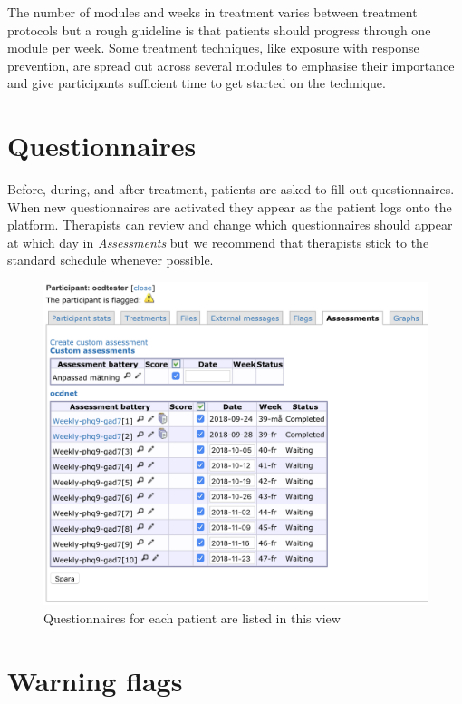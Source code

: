 \documentclass[]{book}
\theoremstyle{definition}
\theoremstyle{definition}
\theoremstyle{definition}
\theoremstyle{remark}
\begin{document}
The number of modules and weeks in treatment varies between treatment
protocols but a rough guideline is that patients should progress through
one module per week. Some treatment techniques, like exposure with
response prevention, are spread out across several modules to emphasise
their importance and give participants sufficient time to get started on
the technique.

\hypertarget{questionnaires}{%
\section{Questionnaires}\label{questionnaires}}

Before, during, and after treatment, patients are asked to fill out
questionnaires. When new questionnaires are activated they appear as the
patient logs onto the platform. Therapists can review and change which
questionnaires should appear at which day in \emph{Assessments} but we
recommend that therapists stick to the standard schedule whenever
possible.

\begin{figure}
\centering
\includegraphics{images/assessments-list.png}
\caption{Questionnaires for each patient are listed in this view}
\end{figure}

\hypertarget{warning-flags}{%
\section{Warning flags}\label{warning-flags}}
\end{document}
